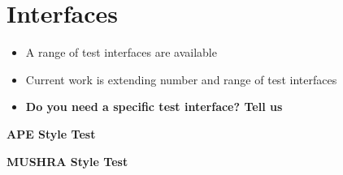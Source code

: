 \vspace{-0.8cm}
\section{Interfaces}

\begin{itemize}
\item A range of test interfaces are available
\item Current work is extending number and range of test interfaces
\item {\bf Do you need a specific test interface? Tell us}
\end{itemize}




 \centering
 \small
 \textbf{APE Style Test}
 
 \centering
 \small
 \textbf{MUSHRA Style Test}






